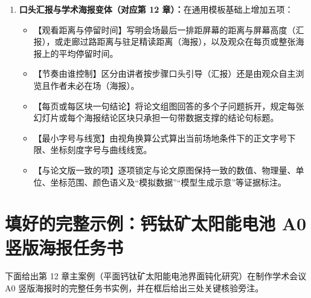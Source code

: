 \begin{enumerate}
\begin{itemize}
  \end{itemize}
  \item \textbf{口头汇报与学术海报变体（对应第 12 章）：}在通用模板基础上增加五项：
  \begin{itemize}
    \item 【观看距离与停留时间】写明会场最后一排距屏幕的距离与屏幕高度（汇报），或走廊过路距离与驻足精读距离（海报），以及观众在每页或整张海报上的平均停留时间。
    \item 【节奏由谁控制】区分由讲者按步骤口头引导（汇报）还是由观众自主浏览且作者未必在场（海报）。
    \item 【每页或每区块一句结论】将论文组图回答的多个子问题拆开，规定每张幻灯片或每个海报结论区块只承担一句带数据支撑的结论句标题。
    \item 【最小字号与线宽】由视角换算公式算出当前场地条件下的正文字号下限、坐标刻度字号与曲线线宽。
    \item 【与论文版一致的项】逐项锁定与论文原图保持一致的数值、物理量、单位、坐标范围、颜色语义及“模拟数据”“模型生成示意”等证据标注。
  \end{itemize}
\end{enumerate}

\section{填好的完整示例：钙钛矿太阳能电池 A0 竖版海报任务书}

下面给出第 12 章主案例（平面钙钛矿太阳能电池界面钝化研究）在制作学术会议 A0 竖版海报时的完整任务书实例，并在框后给出三处关键核验旁注。

